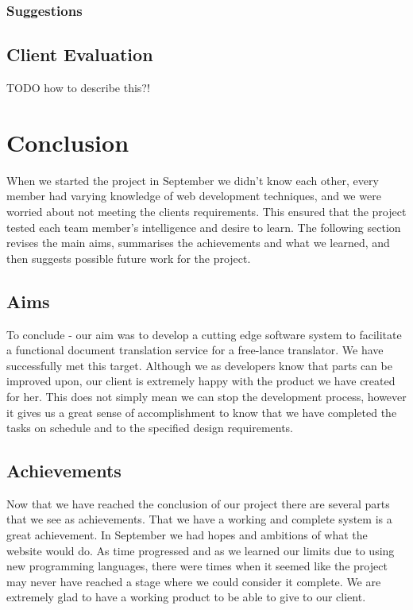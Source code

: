 \documentclass{l3proj}
\begin{document}
\subsection{Suggestions}

\section{Client Evaluation}
\label{trans-eval}
TODO how to describe this?!

\chapter{Conclusion}
\label{chap:concl}

When we started the project in September we didn't know each other, every member had varying knowledge of
web development techniques, and we were worried about not meeting the clients requirements. This ensured that the project tested each team member’s intelligence
and desire to learn. The following section revises the main aims, summarises the achievements and
what we learned, and then suggests possible future work for the project.

\section{Aims}
\label{sect:aims}
To conclude - our aim was to develop a cutting edge software system to facilitate a functional document translation service for a
free-lance translator. We have successfully met this target. Although we as developers know that parts can be improved upon, our client
is extremely happy with the product we have created for her. This does not simply mean we can stop the development process, however 
it gives us a great sense of accomplishment to know that we have completed the tasks on schedule and to the specified design requirements.

\section{Achievements}
\label{sect:achv}
Now that we have reached the conclusion of our project there are several parts that we see as achievements.
That we have a working and complete system is a great achievement. In September we had hopes
and ambitions of what the website would do. As time progressed and as we learned our limits due to using new
programming languages, there were times when it seemed like the project may never have reached a stage where 
we could consider it complete. We are extremely glad to have a working product to be able to give to our client.
\end{document}
